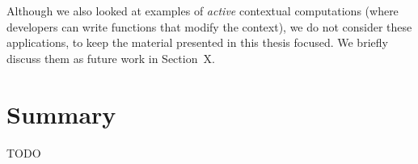 Although we also looked at examples of \emph{active} contextual computations (where developers can
write functions that modify the context), we do not consider these applications, to keep the 
material presented in this thesis focused. We briefly discuss them as future work in Section~X.


\section{Summary}

TODO

% 
